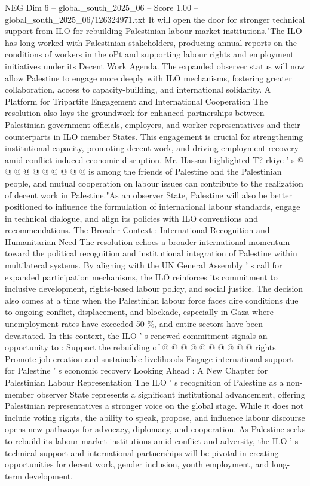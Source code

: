 \begin{textsample}{NEG Dim 6 – global\_south\_2025\_06 – Score 1.00 – global\_south\_2025\_06/126324971.txt}
It will open the door for stronger technical support from ILO for rebuilding Palestinian labour market institutions."The ILO has long worked with Palestinian stakeholders, producing annual reports on the conditions of workers in the oPt and supporting labour rights and employment initiatives under its Decent Work Agenda.
The expanded observer status will now allow Palestine to engage more deeply with ILO mechanisms, fostering greater collaboration, access to capacity-building, and international solidarity.
A Platform for Tripartite Engagement and International Cooperation The resolution also lays the groundwork for enhanced partnerships between Palestinian government officials, employers, and worker representatives and their counterparts in ILO member States.
This engagement is crucial for strengthening institutional capacity, promoting decent work, and driving employment recovery amid conflict-induced economic disruption.
Mr.
Hassan highlighted T? rkiye ' s @ @ @ @ @ @ @ @ @ @ is among the friends of Palestine and the Palestinian people, and mutual cooperation on labour issues can contribute to the realization of decent work in Palestine."As an observer State, Palestine will also be better positioned to influence the formulation of international labour standards, engage in technical dialogue, and align its policies with ILO conventions and recommendations.
The Broader Context : International Recognition and Humanitarian Need The resolution echoes a broader international momentum toward the political recognition and institutional integration of Palestine within multilateral systems.
By aligning with the UN General Assembly ' s call for expanded participation mechanisms, the ILO reinforces its commitment to inclusive development, rights-based labour policy, and social justice.
The decision also comes at a time when the Palestinian labour force faces dire conditions due to ongoing conflict, displacement, and blockade, especially in Gaza where unemployment rates have exceeded 50 \%, and entire sectors have been devastated.
In this context, the ILO ' s renewed commitment signals an opportunity to : Support the rebuilding of @ @ @ @ @ @ @ @ @ @ rights Promote job creation and sustainable livelihoods Engage international support for Palestine ' s economic recovery Looking Ahead : A New Chapter for Palestinian Labour Representation The ILO ' s recognition of Palestine as a non-member observer State represents a significant institutional advancement, offering Palestinian representatives a stronger voice on the global stage.
While it does not include voting rights, the ability to speak, propose, and influence labour discourse opens new pathways for advocacy, diplomacy, and cooperation.
As Palestine seeks to rebuild its labour market institutions amid conflict and adversity, the ILO ' s technical support and international partnerships will be pivotal in creating opportunities for decent work, gender inclusion, youth employment, and long-term development.

\end{textsample}
